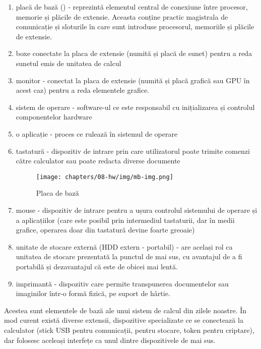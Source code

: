\begin{enumerate}
\item placă de bază () - reprezintă elementul central de conexiune între
          procesor, memorie și plăcile de extensie. Aceasta conține
          practic magistrala de comunicație și sloturile în care sunt
          introduse procesorul, memoriile și plăcile de extensie.

  \item boxe conectate la placa de extensie (numită și placă de sunet)
          pentru a reda sunetul emis de unitatea de calcul
  \item monitor - conectat la placa de extensie (numită și placă grafică
          sau GPU  în acest caz)
          pentru a reda elementele grafice.
  \item sistem de operare - software-ul ce este responsabil cu
          inițializarea și controlul componentelor hardware
  \item o aplicație - proces ce rulează în sistemul de operare
  \item tastatură - dispozitiv de intrare prin care utilizatorul poate trimite
          comenzi către calculator sau poate redacta diverse documente

\begin{figure}[!htbp]
  \centering
  \texttt{[image: chapters/08-hw/img/mb-img.png]}
  \caption{Placa de bază\protect\footnotemark}
  \label{fig:hw:mb}
\end{figure}

  \item mouse - dispozitiv de intrare pentru a ușura controlul sistemului
          de operare și a aplicațiilor (care este posibil prin intermediul
          tastaturii, dar în medii grafice, operarea doar din tastatură
          devine foarte greoaie)
  \item unitate de stocare externă (HDD extern - portabil) - are
          același rol ca unitatea de stocare prezentată la punctul de mai sus,
          cu avantajul de a fi portabilă și dezavantajul că este de obicei
          mai lentă.
  \item imprimantă - dispozitiv care permite transpunerea documentelor
          sau imaginilor într-o formă fizică, pe suport de hârtie.

\end{enumerate}

Acestea sunt elementele de bază ale unui sistem de calcul din zilele noastre. În
mod curent există diverse extensii, dispozitive specializate ce se conectează la
calculator (stick USB pentru comunicații, pentru stocare, token pentru
criptare), dar folosesc aceleași interfețe ca unul dintre dispozitivele de mai sus.

